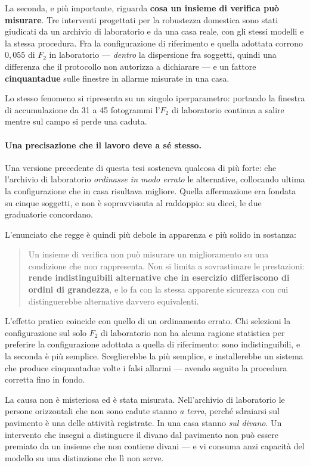 La seconda, e più importante, riguarda \textbf{cosa un insieme di verifica può
misurare}. Tre interventi progettati per la robustezza domestica sono stati
giudicati da un archivio di laboratorio e da una casa reale, con gli stessi
modelli e la stessa procedura. Fra la configurazione di riferimento e quella
adottata corrono $0{,}055$ di $F_2$ in laboratorio --- \emph{dentro} la
dispersione fra soggetti, quindi una differenza che il protocollo non
autorizza a dichiarare --- e un fattore \textbf{cinquantadue} sulle finestre in
allarme misurate in una casa.

Lo stesso fenomeno si ripresenta su un singolo iperparametro: portando la
finestra di accumulazione da 31 a 45 fotogrammi l'$F_2$ di laboratorio
continua a salire mentre sul campo si perde una caduta.

\paragraph{Una precisazione che il lavoro deve a sé stesso.} Una versione
precedente di questa tesi sosteneva qualcosa di più forte: che l'archivio di
laboratorio \emph{ordinasse in modo errato} le alternative, collocando ultima
la configurazione che in casa risultava migliore. Quella affermazione era
fondata su cinque soggetti, e non è sopravvissuta al raddoppio: su dieci, le
due graduatorie concordano.

L'enunciato che regge è quindi più debole in apparenza e più solido in
sostanza:

\begin{quote}
Un insieme di verifica non può misurare un miglioramento su una condizione che
non rappresenta. Non si limita a sovrastimare le prestazioni: \textbf{rende
indistinguibili alternative che in esercizio differiscono di ordini di
grandezza}, e lo fa con la stessa apparente sicurezza con cui distinguerebbe
alternative davvero equivalenti.
\end{quote}

L'effetto pratico coincide con quello di un ordinamento errato. Chi selezioni
la configurazione sul solo $F_2$ di laboratorio non ha alcuna ragione
statistica per preferire la configurazione adottata a quella di riferimento:
sono indistinguibili, e la seconda è più semplice. Sceglierebbe la più
semplice, e installerebbe un sistema che produce cinquantadue volte i falsi
allarmi --- avendo seguito la procedura corretta fino in fondo.

La causa non è misteriosa ed è stata misurata. Nell'archivio di laboratorio le
persone orizzontali che non sono cadute stanno \emph{a terra}, perché
sdraiarsi sul pavimento è una delle attività registrate. In una casa stanno
\emph{sul divano}. Un intervento che insegni a distinguere il divano dal
pavimento non può essere premiato da un insieme che non contiene divani ---
e vi consuma anzi capacità del modello su una distinzione che lì non serve.

